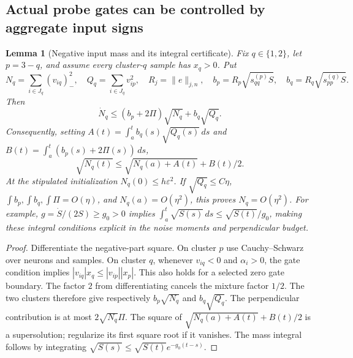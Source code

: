\documentclass{article} %
\theoremstyle{plain}
\newtheorem{lemma}[theorem]{Lemma}
\theoremstyle{definition}
\theoremstyle{remark}
\begin{document}
\subsection{Actual probe gates can be controlled by aggregate input signs}
\begin{lemma}[Negative input mass and its integral certificate]
\label{sbsign:negative}
Fix $q\in\{1,2\}$, let $p=3-q$, and assume every cluster-$q$ sample has
$x_q>0$. Put
\[
 N_q=\sum_{i\in J_q}(v_{iq})_-^2,\quad
 Q_q=\sum_{i\in J_q}v_{ip}^2,\quad
 R_j=\|e\|_{j,n},\quad
 b_p=R_p\sqrt{s_{qq}^{(p)}S},\quad b_q=R_q\sqrt{s_{pp}^{(q)}S}.
\]
Then
\[
 \dot N_q\le(b_p+2\Pi)\sqrt{N_q}+b_q\sqrt{Q_q}.
\]
Consequently, setting
$A(t)=\int_a^t b_q(s)\sqrt{Q_q(s)}\,ds$ and
$B(t)=\int_a^t(b_p(s)+2\Pi(s))\,ds$,
\begin{equation}\label{sbsign:negative-integral}
 \sqrt{N_q(t)}\le\sqrt{N_q(a)+A(t)}+B(t)/2.
\end{equation}
At the stipulated initialization $N_q(0)\le h\varepsilon^2$.
If $\sqrt{Q_q}\le C\eta$, $\int b_p,\int b_q,\int\Pi=O(\eta)$,
and $N_q(a)=O(\eta^2)$, this proves $N_q=O(\eta^2)$.
For example, $g=\dot S/(2S)\ge g_0>0$ implies
$\int_a^t\sqrt{S(s)}\,ds\le\sqrt{S(t)}/g_0$, making these integral
conditions explicit in the noise moments and perpendicular budget.
\end{lemma}
\begin{proof}
Differentiate the negative-part square. On cluster $p$ use
Cauchy--Schwarz over neurons and samples. On cluster $q$, whenever
$v_{iq}<0$ and $\alpha_i>0$, the gate condition implies
$|v_{iq}|x_q\le|v_{ip}||x_p|$. This also holds for a selected zero gate
boundary. The factor $2$ from differentiating cancels the mixture factor
$1/2$. The two clusters therefore give respectively $b_p\sqrt{N_q}$
and $b_q\sqrt{Q_q}$. The perpendicular contribution is at most
$2\sqrt{N_q}\Pi$.
The square of $\sqrt{N_q(a)+A(t)}+B(t)/2$ is a supersolution;
regularize its first square root if it vanishes.
The mass integral follows by integrating
$\sqrt{S(s)}\le\sqrt{S(t)}e^{-g_0(t-s)}$.
\end{proof}
\end{document}
